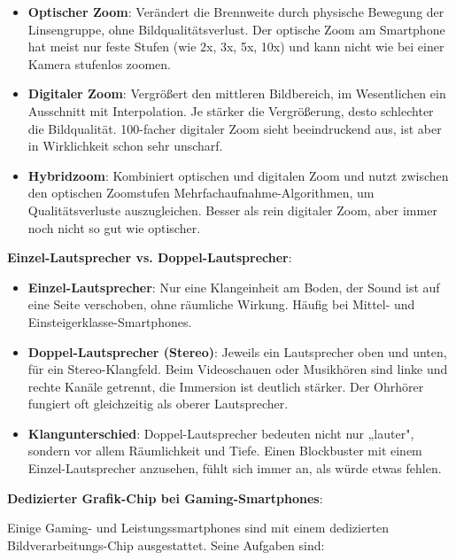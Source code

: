 
\begin{itemize}
  \item \textbf{Optischer Zoom}: Verändert die Brennweite durch physische Bewegung der Linsengruppe, ohne Bildqualitätsverlust. Der optische Zoom am Smartphone hat meist nur feste Stufen (wie 2x, 3x, 5x, 10x) und kann nicht wie bei einer Kamera stufenlos zoomen.
  \item \textbf{Digitaler Zoom}: Vergrößert den mittleren Bildbereich, im Wesentlichen ein Ausschnitt mit Interpolation. Je stärker die Vergrößerung, desto schlechter die Bildqualität. 100-facher digitaler Zoom sieht beeindruckend aus, ist aber in Wirklichkeit schon sehr unscharf.
  \item \textbf{Hybridzoom}: Kombiniert optischen und digitalen Zoom und nutzt zwischen den optischen Zoomstufen Mehrfachaufnahme-Algorithmen, um Qualitätsverluste auszugleichen. Besser als rein digitaler Zoom, aber immer noch nicht so gut wie optischer.
\end{itemize}


\textbf{Einzel-Lautsprecher vs. Doppel-Lautsprecher}:

\begin{itemize}
  \item \textbf{Einzel-Lautsprecher}: Nur eine Klangeinheit am Boden, der Sound ist auf eine Seite verschoben, ohne räumliche Wirkung. Häufig bei Mittel- und Einsteigerklasse-Smartphones.
  \item \textbf{Doppel-Lautsprecher (Stereo)}: Jeweils ein Lautsprecher oben und unten, für ein Stereo-Klangfeld. Beim Videoschauen oder Musikhören sind linke und rechte Kanäle getrennt, die Immersion ist deutlich stärker. Der Ohrhörer fungiert oft gleichzeitig als oberer Lautsprecher.
  \item \textbf{Klangunterschied}: Doppel-Lautsprecher bedeuten nicht nur „lauter", sondern vor allem Räumlichkeit und Tiefe. Einen Blockbuster mit einem Einzel-Lautsprecher anzusehen, fühlt sich immer an, als würde etwas fehlen.
\end{itemize}

\textbf{Dedizierter Grafik-Chip bei Gaming-Smartphones}:

Einige Gaming- und Leistungssmartphones sind mit einem dedizierten Bildverarbeitungs-Chip ausgestattet. Seine Aufgaben sind:

